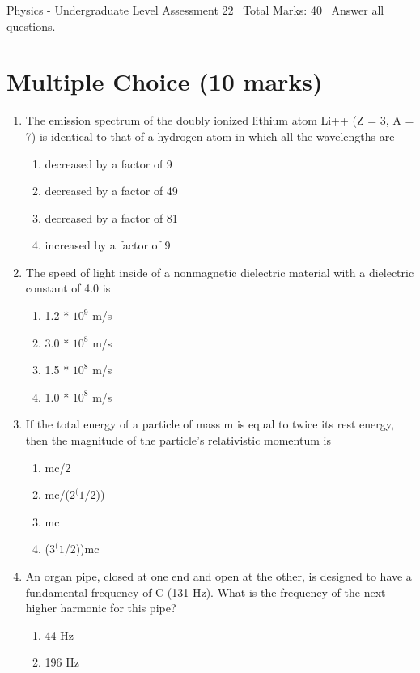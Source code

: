 \documentclass[12pt]{article}
\begin{document}
\begin{center}
Physics - Undergraduate Level Assessment 22 \
Total Marks: 40 \
Answer all questions.
\end{center}

\section*{Multiple Choice (10 marks)}
\begin{enumerate}[label=\arabic*.]
\item The emission spectrum of the doubly ionized lithium atom Li++ (Z = 3, A = 7) is identical to that of a hydrogen atom in which all the wavelengths are
\begin{enumerate}[label=(\alph*)]
    \item decreased by a factor of 9
    \item decreased by a factor of 49
    \item decreased by a factor of 81
    \item increased by a factor of 9
\end{enumerate}
\item The speed of light inside of a nonmagnetic dielectric material with a dielectric constant of 4.0 is
\begin{enumerate}[label=(\alph*)]
    \item 1.2 * $10^9$ m/s
    \item 3.0 * $10^8$ m/s
    \item 1.5 * $10^8$ m/s
    \item 1.0 * $10^8$ m/s
\end{enumerate}
\item If the total energy of a particle of mass m is equal to twice its rest energy, then the magnitude of the particle's relativistic momentum is
\begin{enumerate}[label=(\alph*)]
    \item mc/2
    \item mc/($2^(1$/2))
    \item mc
    \item ($3^(1$/2))mc
\end{enumerate}
\item An organ pipe, closed at one end and open at the other, is designed to have a fundamental frequency of C (131 Hz). What is the frequency of the next higher harmonic for this pipe?
\begin{enumerate}[label=(\alph*)]
    \item 44 Hz
    \item 196 Hz

\end{enumerate}
\end{enumerate}
\end{document}
